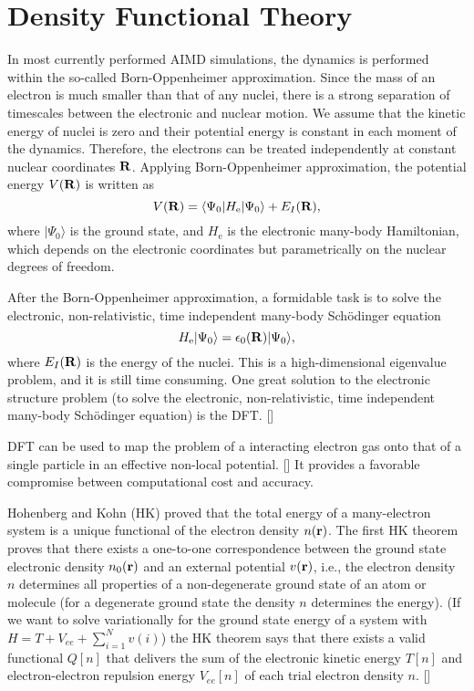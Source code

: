 \section{Density Functional Theory} \label{section_DFT}
In most currently performed AIMD simulations, the dynamics is performed within the so-called Born-Oppenheimer approximation.
Since the mass of an electron is much smaller than that of any nuclei, there is a strong separation of timescales between the electronic and nuclear motion. 
We assume that the kinetic energy of nuclei is zero and their potential energy is constant in each moment of the dynamics.
Therefore, the electrons can be treated independently at constant nuclear coordinates $\bf R$.
Applying Born-Oppenheimer approximation, the potential energy $V(\bf R)$ is  written as
\begin{equation}
  V({\bf R})=\langle \Psi_0 | H_{\text{e}} | \Psi_0 \rangle + E_{I}({\bf R}),
\label{eq:BO}
\end{equation}
where $|\Psi_0\rangle$ is the ground state, 
and $H_{\text{e}}$ is the electronic many-body Hamiltonian, which depends on the electronic 
coordinates but parametrically on the nuclear degrees of freedom. 

After the Born-Oppenheimer approximation, a formidable task is to solve the electronic, non-relativistic, time independent many-body Sch\"{o}dinger equation
\begin{equation}
H_{\text{e}} |\Psi_0 \rangle = \epsilon_0({\bf R})|\Psi_0 \rangle,
\label{eq:SE}
\end{equation}
where $E_I({\bf R})$ is the energy of the nuclei.
This is a high-dimensional eigenvalue problem, and it is still time consuming. 
One great solution to the electronic structure problem (to solve the electronic, non-relativistic, time independent many-body 
Sch\"{o}dinger equation) is the DFT. [\cite{HK64,KS65}]

DFT can be used to map the problem of a interacting electron gas onto that of a single particle in an effective non-local 
potential. [\cite{MCP92}] It provides a favorable compromise between computational cost and accuracy.

Hohenberg and Kohn (HK) proved that the total energy of a many-electron system is a unique functional of the electron density $n(\bf r)$.
The first HK theorem proves that there exists a one-to-one correspondence between the ground state electronic density $n_0(\bf r)$ 
and an external potential $v(\bf r)$, i.e., the electron density  $n$ determines all
properties of a non-degenerate ground state of an atom or molecule (for a degenerate 
ground state the density $n$ determines the energy).
(If we want to solve variationally for the ground state energy of a system with $H=T + V_{ee}+\sum_{i=1}^N v(i)$) the 
HK theorem says that there exists a valid functional $Q[n]$ that delivers the sum of the electronic kinetic energy $T[n]$ 
and electron-electron repulsion energy $V_{ee}[n]$ of each trial electron density $n$. [\cite{Levy1979}]

